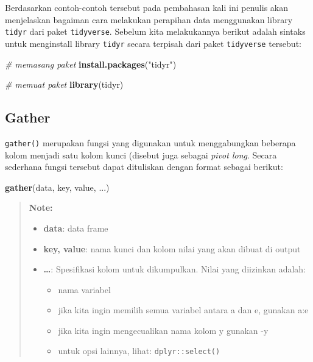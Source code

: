 \documentclass[]{book}
\newenvironment{Shaded}{\begin{snugshade}}{\end{snugshade}}
\newcommand{\KeywordTok}[1]{\textcolor[rgb]{0.13,0.29,0.53}{\textbf{#1}}}
\newcommand{\StringTok}[1]{\textcolor[rgb]{0.31,0.60,0.02}{#1}}
\newcommand{\CommentTok}[1]{\textcolor[rgb]{0.56,0.35,0.01}{\textit{#1}}}
\newcommand{\NormalTok}[1]{#1}
\providecommand{\tightlist}{%
  \setlength{\itemsep}{0pt}\setlength{\parskip}{0pt}}
\begin{document}
Berdasarkan contoh-contoh tersebut pada pembahasan kali ini penulis akan
menjelaskan bagaiman cara melakukan perapihan data menggunakan library
\texttt{tidyr} dari paket \texttt{tidyverse}. Sebelum kita melakukannya
berikut adalah sintaks untuk menginstall library \texttt{tidyr} secara
terpisah dari paket \texttt{tidyverse} tersebut:

\begin{Shaded}
\begin{Highlighting}[]
\CommentTok{# memasang paket}
\KeywordTok{install.packages}\NormalTok{(}\StringTok{"tidyr"}\NormalTok{)}
\end{Highlighting}
\end{Shaded}

\begin{Shaded}
\begin{Highlighting}[]
\CommentTok{# memuat paket}
\KeywordTok{library}\NormalTok{(tidyr)}
\end{Highlighting}
\end{Shaded}

\subsection{Gather}\label{gather}

\texttt{gather()} merupakan fungsi yang digunakan untuk menggabungkan
beberapa kolom menjadi satu kolom kunci (disebut juga sebagai
\emph{pivot long}. Secara sederhana fungsi tersebut dapat dituliskan
dengan format sebagai berikut:

\begin{Shaded}
\begin{Highlighting}[]
\KeywordTok{gather}\NormalTok{(data, key, value, ...)}
\end{Highlighting}
\end{Shaded}

\begin{quote}
\textbf{Note: }

\begin{itemize}
\tightlist
\item
  \textbf{data}: data frame
\item
  \textbf{key, value}: nama kunci dan kolom nilai yang akan dibuat di
  output
\item
  \textbf{\ldots{}}: Spesifikasi kolom untuk dikumpulkan. Nilai yang
  diizinkan adalah:

  \begin{itemize}
  \tightlist
  \item
    nama variabel
  \item
    jika kita ingin memilih semua variabel antara a dan e, gunakan a:e
  \item
    jika kita ingin mengecualikan nama kolom y gunakan -y
  \item
    untuk opsi lainnya, lihat: \texttt{dplyr::select()}
  \end{itemize}
\end{itemize}
\end{quote}
\end{document}

